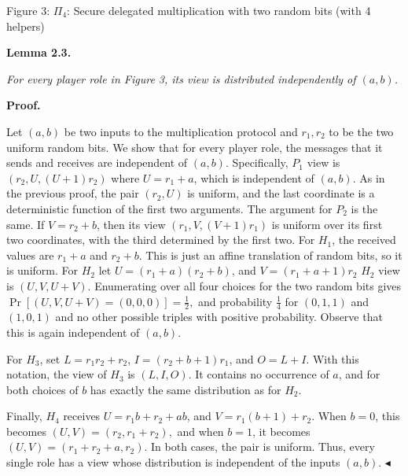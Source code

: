 Figure 3: $\Pi_{4}$: Secure delegated multiplication with two random bits (with 4 helpers)




\par\medskip\noindent\textbf{
\textbf{Lemma 2.3}\textbf{.}
}\par



\emph{For every player role in Figure 3, its view is distributed independently of $(a,b)$.}\par






\par\medskip\noindent\textbf{Proof.}\par




Let $(a,b)$ be two inputs to the multiplication protocol and $r_{1},r_{2}$ to be the two uniform random bits. We show that for every player role, the messages that it sends and receives are independent of $(a,b)$.
Specifically, $P_{1}$ view is
$(r_{2},U,(U+1)r_{2})$ where $U=r_{1}+a$, which is independent of $(a,b)$.
As in the previous proof, the pair $(r_{2},U)$ is uniform, and the last coordinate is a deterministic function of the first two arguments. The argument for $P_{2}$ is the same. If $V=r_{2}+b$, then its view
$(r_{1},V,(V+1)r_{1})$
is uniform over its first two coordinates, with the third determined by the first two.
For $H_{1}$, the received values are $r_{1}+a$ and $r_{2}+b$. This is just an affine translation of random bits, so it is uniform. For $H_{2}$ let
$U=(r_{1}+a)(r_{2}+b)$, and $V=(r_{1}+a+1)r_{2}$
$H_{2}$ view is $(U,V,U+V)$. Enumerating over all four choices for the two random bits gives
$\Pr[(U,V,U+V)=(0,0,0)]=\frac{1}{2},$
and probability $\frac{1}{4}$ for
$(0,1,1)$ and $(1,0,1)$ and no other possible triples with positive probability. Observe that this is again independent of $(a,b)$.\par




For $H_{3}$, set
$L=r_{1}r_{2}+r_{2}$, $I=(r_{2}+b+1)r_{1}$, and $O=L+I$. With this notation,
the view of $H_{3}$ is $(L,I,O)$. It contains no occurrence of $a$, and for both choices of $b$ has exactly the same distribution as for $H_{2}$.\par




Finally, $H_{4}$ receives
$U=r_{1}b+r_{2}+ab$, and $V=r_{1}(b+1)+r_{2}$.
When $b=0$, this becomes
$(U,V)=(r_{2},r_{1}+r_{2}),$
and when $b=1$, it becomes
$(U,V)=(r_{1}+r_{2}+a,r_{2}).$
In both cases, the pair is uniform.
Thus, every single role has a view whose distribution is independent of the inputs $(a,b)$.
$\blacktriangleleft$\par






